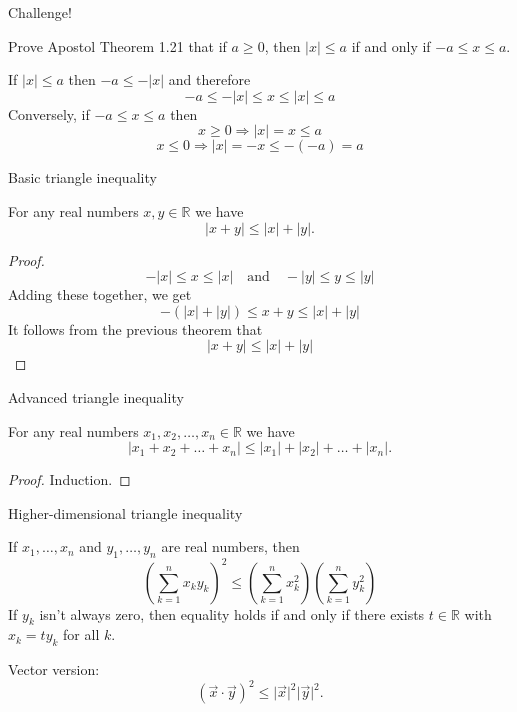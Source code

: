 \documentclass{beamer}
\begin{document}
\begin{frame}{Challenge!}
\begin{prob}
Prove Apostol Theorem 1.21 that if $a\geq 0$, then $\lvert x\rvert \leq a$ if and only if $-a\leq x\leq a$.
\end{prob}
\pause 
\begin{soln}
If $\lvert x\rvert \leq a$ then $-a\leq -\lvert x\rvert$
\pause 
and therefore
$$-a\leq -\lvert x\rvert \leq x\leq \lvert x\rvert\leq a$$
\pause 
Conversely, if $-a\leq x\leq a$ then
\pause 
$$x\geq 0\Rightarrow \lvert x\rvert = x\leq a$$
\pause 
$$x\leq 0\Rightarrow \lvert x\rvert = -x\leq -(-a) = a$$
\end{soln}
\end{frame}

\begin{frame}{Basic triangle inequality}
\begin{thm}
For any real numbers $x,y\in\mathbb{R}$ we have
$$\lvert x+y\rvert\leq \lvert x \rvert + \lvert y\rvert.$$
\end{thm}
\pause 
\begin{proof}
$$
-\lvert x \rvert \leq x\leq \lvert x\rvert
\quad\text{and}\quad
-\lvert y \rvert \leq y\leq \lvert y\rvert
$$
\pause
Adding these together, we get
$$
-(\lvert x \rvert + \lvert y \rvert) \leq x + y\leq \lvert x\rvert + \lvert y\rvert
$$
\pause
It follows from the previous theorem that
$$\lvert x + y\rvert \leq \lvert x\rvert + \lvert y\rvert$$
\end{proof}
\end{frame}

\begin{frame}{Advanced triangle inequality}
\begin{thm}
For any real numbers $x_1,x_2,\dots,x_n\in\mathbb{R}$ we have
$$\lvert x_1+x_2+\dots+x_n\rvert\leq \lvert x_1 \rvert + \lvert x_2\rvert +  \dots + \lvert x_n\rvert.$$
\end{thm}
\pause
\begin{proof}
Induction.
\end{proof}
\end{frame}

\begin{frame}{Higher-dimensional triangle inequality}
\begin{thm}
If $x_1,\dots,x_n$ and $y_1,\dots, y_n$ are real numbers, then
$$\left(\sum_{k=1}^n x_ky_k\right)^2\leq \left(\sum_{k=1}^n x_k^2\right)\left(\sum_{k=1}^n y_k^2\right)$$
If $y_k$ isn't always zero, then equality holds if and only if there exists $t\in\mathbb{R}$ with $x_k = ty_k$ for all $k$.
\end{thm}
\pause
Vector version:
$$(\vec x\cdot\vec y)^2 \leq \lvert \vec x\rvert^2\lvert \vec y\rvert^2.$$
\end{frame}
\end{document}
